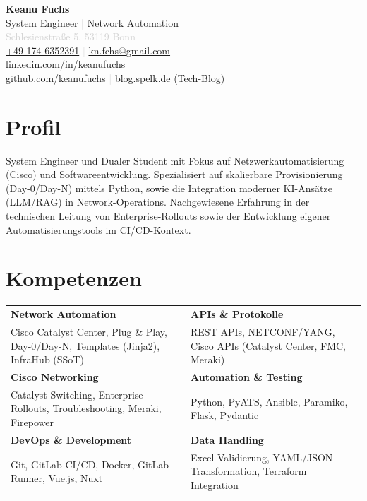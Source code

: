 \documentclass[11pt,a4paper]{article}
\begin{document}
\thispagestyle{empty}

\noindent
\begin{minipage}[t]{0.65\textwidth}
    {\Huge\bfseries\color{darkblue}Keanu Fuchs}\\[4pt]
    {\Large\color{lightgray}System Engineer | Network Automation}\\[10pt]
    \textcolor{lightgray}{
        Schlesienstraße 5, 53119 Bonn\\
        \href{tel:+491746352391}{+49 174 6352391} | \href{mailto:kn.fchs@gmail.com}{kn.fchs@gmail.com}\\
        \href{https://linkedin.com/in/keanufuchs}{linkedin.com/in/keanufuchs} \\
        \href{https://github.com/keanufuchs}{github.com/keanufuchs} | \href{https://blog.spelk.de}{blog.spelk.de (Tech-Blog)}
    }
\end{minipage}
\hfill

\vspace{20pt}

\pagestyle{fancy}

\section*{Profil}
System Engineer und Dualer Student mit Fokus auf Netzwerkautomatisierung (Cisco) und Softwareentwicklung. Spezialisiert auf skalierbare Provisionierung (Day-0/Day-N) mittels Python, sowie die Integration moderner KI-Ansätze (LLM/RAG) in Network-Operations. Nachgewiesene Erfahrung in der technischen Leitung von Enterprise-Rollouts sowie der Entwicklung eigener Automatisierungstools im CI/CD-Kontext.
\vspace{10pt}

\section*{Kompetenzen}
\begin{tabularx}{\textwidth}{@{}X@{\hspace{2em}}X@{}}
    \textbf{Network Automation} & \textbf{APIs \& Protokolle}\\
    Cisco Catalyst Center, Plug \& Play, Day-0/Day-N, Templates (Jinja2), InfraHub (SSoT) & REST APIs, NETCONF/YANG, Cisco APIs (Catalyst Center, FMC, Meraki)\\[8pt]
    
    \textbf{Cisco Networking} & \textbf{Automation \& Testing}\\
    Catalyst Switching, Enterprise Rollouts, Troubleshooting, Meraki, Firepower & Python, PyATS, Ansible, Paramiko, Flask, Pydantic\\[8pt]
    
    \textbf{DevOps \& Development} & \textbf{Data Handling}\\
    Git, GitLab CI/CD, Docker, GitLab Runner, Vue.js, Nuxt & Excel-Validierung, YAML/JSON Transformation, Terraform Integration\\
\end{tabularx}
\end{document}
